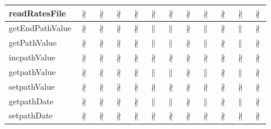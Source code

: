 \documentclass[10pt]{article}
\begin{document}
\begin{longtable}{|l|l|l|l|l|l|l|l|l|l|l|l|}
\hline
readRatesFile&{\color{BrickRed}$\nparallel$}&{\color{BrickRed}$\nparallel$}&{\color{BrickRed}$\nparallel$}&{\color{BrickRed}$\nparallel$}&{\color{BrickRed}$\nparallel$}&{\color{BrickRed}$\nparallel$}&{\color{BrickRed}$\nparallel$}&{\color{BrickRed}$\nparallel$}&{\color{BrickRed}$\nparallel$}&{\color{BrickRed}$\nparallel$}&{\color{BrickRed}$\nparallel$}\\
\hline
getEndPathValue&{\color{BrickRed}$\nparallel$}&{\color{BrickRed}$\nparallel$}&{\color{BrickRed}$\nparallel$}&{\color{BrickRed}$\nparallel$}&{\color{blue}$\parallel$}&{\color{blue}$\parallel$}&{\color{BrickRed}$\nparallel$}&{\color{blue}$\parallel$}&{\color{BrickRed}$\nparallel$}&{\color{blue}$\parallel$}&{\color{BrickRed}$\nparallel$}\\
\hline
getPathValue&{\color{BrickRed}$\nparallel$}&{\color{BrickRed}$\nparallel$}&{\color{BrickRed}$\nparallel$}&{\color{BrickRed}$\nparallel$}&{\color{blue}$\parallel$}&{\color{blue}$\parallel$}&{\color{BrickRed}$\nparallel$}&{\color{blue}$\parallel$}&{\color{BrickRed}$\nparallel$}&{\color{blue}$\parallel$}&{\color{BrickRed}$\nparallel$}\\
\hline
incpathValue&{\color{BrickRed}$\nparallel$}&{\color{BrickRed}$\nparallel$}&{\color{BrickRed}$\nparallel$}&{\color{BrickRed}$\nparallel$}&{\color{BrickRed}$\nparallel$}&{\color{BrickRed}$\nparallel$}&{\color{BrickRed}$\nparallel$}&{\color{BrickRed}$\nparallel$}&{\color{BrickRed}$\nparallel$}&{\color{BrickRed}$\nparallel$}&{\color{BrickRed}$\nparallel$}\\
\hline
getpathValue&{\color{BrickRed}$\nparallel$}&{\color{BrickRed}$\nparallel$}&{\color{BrickRed}$\nparallel$}&{\color{BrickRed}$\nparallel$}&{\color{blue}$\parallel$}&{\color{blue}$\parallel$}&{\color{BrickRed}$\nparallel$}&{\color{blue}$\parallel$}&{\color{BrickRed}$\nparallel$}&{\color{blue}$\parallel$}&{\color{BrickRed}$\nparallel$}\\
\hline
setpathValue&{\color{BrickRed}$\nparallel$}&{\color{BrickRed}$\nparallel$}&{\color{BrickRed}$\nparallel$}&{\color{BrickRed}$\nparallel$}&{\color{BrickRed}$\nparallel$}&{\color{BrickRed}$\nparallel$}&{\color{BrickRed}$\nparallel$}&{\color{BrickRed}$\nparallel$}&{\color{BrickRed}$\nparallel$}&{\color{BrickRed}$\nparallel$}&{\color{BrickRed}$\nparallel$}\\
\hline
getpathDate&{\color{BrickRed}$\nparallel$}&{\color{BrickRed}$\nparallel$}&{\color{BrickRed}$\nparallel$}&{\color{BrickRed}$\nparallel$}&{\color{blue}$\parallel$}&{\color{blue}$\parallel$}&{\color{BrickRed}$\nparallel$}&{\color{blue}$\parallel$}&{\color{BrickRed}$\nparallel$}&{\color{blue}$\parallel$}&{\color{BrickRed}$\nparallel$}\\
\hline
setpathDate&{\color{BrickRed}$\nparallel$}&{\color{BrickRed}$\nparallel$}&{\color{BrickRed}$\nparallel$}&{\color{BrickRed}$\nparallel$}&{\color{BrickRed}$\nparallel$}&{\color{BrickRed}$\nparallel$}&{\color{BrickRed}$\nparallel$}&{\color{BrickRed}$\nparallel$}&{\color{BrickRed}$\nparallel$}&{\color{BrickRed}$\nparallel$}&{\color{BrickRed}$\nparallel$}\\
\hline
\end{longtable}
\newpage
\end{document}
